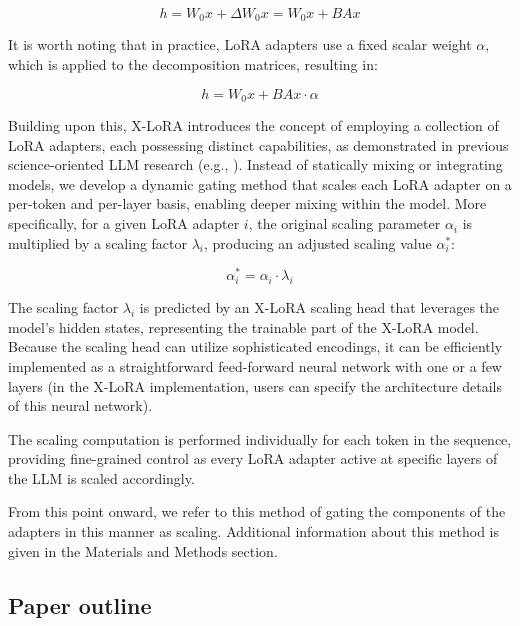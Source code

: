 \begin{equation}
    h = W_0x + \Delta W_0x = W_0x + BAx
\end{equation}

It is worth noting that in practice, LoRA adapters use a fixed scalar weight $\alpha$, which is applied to the decomposition matrices, resulting in:

\begin{equation}
    h = W_0x + BAx \cdot \alpha
\end{equation}

Building upon this, X-LoRA introduces the concept of employing a collection of LoRA adapters, each possessing distinct capabilities, as demonstrated in previous science-oriented LLM research (e.g., \cite{Buehler2023GenerativeDesign}). Instead of statically mixing or integrating models, we develop a dynamic gating method that scales each LoRA adapter on a per-token and per-layer basis, enabling deeper mixing within the model. More specifically, for a given LoRA adapter $i$, the original scaling parameter $\alpha_i$ is multiplied by a scaling factor $\lambda_i$, producing an adjusted scaling value $\alpha^*_i$:

\begin{equation}
    \alpha^*_i = \alpha_i \cdot \lambda_i
\end{equation}

The scaling factor $\lambda_i$ is predicted by an X-LoRA scaling head that leverages the model’s hidden states, representing the trainable part of the X-LoRA model. Because the scaling head can utilize sophisticated encodings, it can be efficiently implemented as a straightforward feed-forward neural network with one or a few layers (in the X-LoRA implementation, users can specify the architecture details of this neural network).

The scaling computation is performed individually for each token in the sequence, providing fine-grained control as every LoRA adapter active at specific layers of the LLM is scaled accordingly.

From this point onward, we refer to this method of gating the components of the adapters in this manner as scaling. Additional information about this method is given in the Materials and Methods section.

\subsection{Paper outline}

